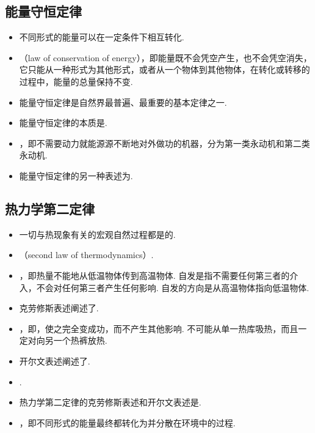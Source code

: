 \subsection{能量守恒定律}
\vspace{10pt}
\begin{itemize}
\item 不同形式的能量可以在一定条件下相互转化.
\item {}（law of conservation of energy），即能量既不会凭空产生，也不会凭空消失，它只能从一种形式为其他形式，或者从一个物体到其他物体，在转化或转移的过程中，能量的总量保持不变.
\item 能量守恒定律是自然界最普遍、最重要的基本定律之一.
\item 能量守恒定律的本质是.
\item {}，即不需要动力就能源源不断地对外做功的机器，分为第一类永动机和第二类永动机.
\item 能量守恒定律的另一种表述为.
\end{itemize}

\subsection{热力学第二定律}
\vspace{10pt}
\begin{itemize}
\item 一切与热现象有关的宏观自然过程都是的.
\item {}（second law of thermodynamics）.
\item {}，即热量不能地从低温物体传到高温物体. 自发是指不需要任何第三者的介入，不会对任何第三者产生任何影响. 自发的方向是从高温物体指向低温物体.
\item 克劳修斯表述阐述了.
\item {}，即，使之完全变成功，而不产生其他影响. 不可能从单一热库吸热，而且一定对向另一个热裤放热.
\item 开尔文表述阐述了.
\item {}.
\item 热力学第二定律的克劳修斯表述和开尔文表述是.
\item {}，即不同形式的能量最终都转化为并分散在环境中的过程.
\end{itemize}